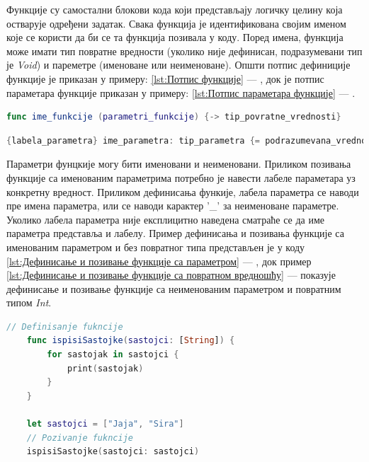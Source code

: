 \documentclass[12pt,oneside]{memoir}
\begin{document}
\indent Функције су самостални блокови кода који представљају логичку целину која остварује одређени задатак. Свака функција је идентификована својим именом које се користи да би се та функција позивала у коду. Поред имена, функција може имати тип повратне вредности (уколико није дефинисан, подразумевани тип је \textit{Void}) и пареметре (именоване или неименоване). Општи потпис дефиниције функције је приказан у примеру: \ref{lst:Потпис функције} --- , док је потпис параметара функције приказан у примеру: \ref{lst:Потпис параметара функције} --- .

\begin{lstlisting}[caption=\textit{{Потпис функције}}, label={lst:Потпис функције}, language=Swift, frame=single]
func ime_funkcije (parametri_funkcije) {-> tip_povratne_vrednosti}
\end{lstlisting}

\begin{lstlisting}[caption=\textit{{Потпис параметара функције}}, label={lst:Потпис параметара функције}, language=Swift, frame=single]
{labela_parametra} ime_parametra: tip_parametra {= podrazumevana_vrednost}
\end{lstlisting}

\indent Параметри фунцкије могу бити именовани и неименовани. Приликом позивања функције са именованим параметрима потребно је навести лабеле параметара уз конкретну вредност. Приликом дефинисања функије, лабела параметра се наводи пре имена параметра, или се наводи карактер '\_' за неименоване параметре. Уколико лабела параметра није експлицитно наведена сматраће се да име параметра представља и лабелу. Пример дефинисања и позивања функције са именованим параметром и без повратног типа представљен је у коду \ref{lst:Дефинисање и позивање функције са параметром} --- , док пример \ref{lst:Дефинисање и позивање функције са повратном вредношћу} ---  показује дефинисање и позивање функције са неименованим параметром и повратним типом \textit{Int}.

\begin{lstlisting}[caption=\textit{{Дефинисање и позивање функције са параметром}}, label={lst:Дефинисање и позивање функције са параметром}, language=Swift, frame=single]
    // Definisanje fukncije
    func ispisiSastojke(sastojci: [String]) {
        for sastojak in sastojci {
            print(sastojak)
        }
    }
    
    let sastojci = ["Jaja", "Sira"]
    // Pozivanje fukncije
    ispisiSastojke(sastojci: sastojci)
\end{lstlisting}
\end{document}
